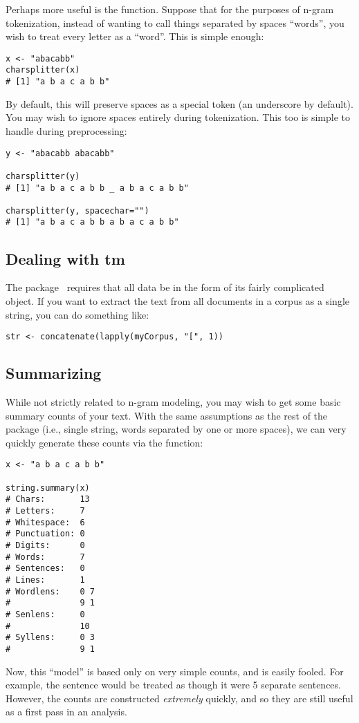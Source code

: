 Perhaps more useful is the  function.  Suppose that for the purposes of n-gram tokenization, instead of wanting to call things separated by spaces ``words'', you wish to treat every letter as a ``word''.  This is simple enough:
\begin{lstlisting}[language=rr]
x <- "abacabb"
charsplitter(x)
# [1] "a b a c a b b"
\end{lstlisting}
By default, this will preserve spaces as a special token (an underscore by default).  You may wish to ignore
spaces entirely during tokenization.  This too is simple to handle during preprocessing:
\begin{lstlisting}[language=rr]
y <- "abacabb abacabb"

charsplitter(y)
# [1] "a b a c a b b _ a b a c a b b"

charsplitter(y, spacechar="")
# [1] "a b a c a b b a b a c a b b"
\end{lstlisting}




\subsection{Dealing with tm}

The  package~\citep{tm} requires that all data be in the form of its fairly complicated  object.
If you want to extract the text from all documents in a corpus as a single string, you can do something like:
\begin{lstlisting}[language=rr]
str <- concatenate(lapply(myCorpus, "[", 1))   
\end{lstlisting}




\subsection{Summarizing}

While not strictly related to n-gram modeling, you may wish to get some basic summary counts of your text.  With
the same assumptions as the rest of the  package (i.e., single string, words separated by one or more
spaces), we can very quickly generate these counts via the  function:
\begin{lstlisting}[language=rr]
x <- "a b a c a b b"
 
string.summary(x)
# Chars:       13
# Letters:     7
# Whitespace:  6
# Punctuation: 0
# Digits:      0
# Words:       7
# Sentences:   0
# Lines:       1 
# Wordlens:    0 7 
#              9 1 
# Senlens:     0 
#              10 
# Syllens:     0 3 
#              9 1 
\end{lstlisting}
Now, this ``model'' is based only on very simple counts, and is easily fooled.  For example, the sentence   would be treated as though it were 5 separate sentences.  However, the counts are constructed \emph{extremely} quickly, and so they are still useful as a first pass in an analysis. 